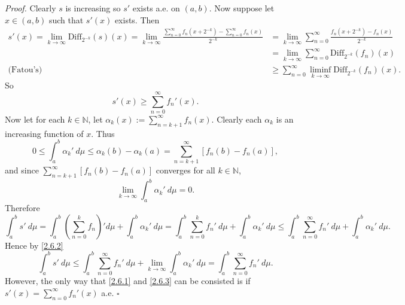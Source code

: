 \documentclass[12pt]{article}
\newcounter{ProofCounter}
\newenvironment{Proof}{\stepcounter{ProofCounter}\textit{Proof.}}{\hfill$\square$}
\begin{document}
\begin{Proof}
Clearly $s$ is increasing so $s'$ exists a.e. on $(a,b)$. Now suppose let $x \in (a,b)$ such that $s'(x)$ exists. Then
\begin{align*}
s'(x) = \lim_{k\rightarrow\infty}\text{Diff}_{2^{-k}}(s)(x) = \lim_{k\rightarrow\infty}\frac{\sum_{n=0}^{\infty}f_{n}(x + 2^{-k}) - \sum_{n=0}^{\infty}
f_{n}(x)}{2^{-k}} 
& = \lim_{k\rightarrow\infty}\sum_{n=0}^{\infty}\frac{f_{n}(x + 2^{-k}) - f_{n}(x)}{2^{-k}} \\
& = \lim_{k\rightarrow\infty}\sum_{n=0}^{\infty}\text{Diff}_{2^{-k}}(f_{n})(x) \\
\text{(Fatou's) } & \geq \sum_{n=0}^{\infty} \liminf_{k\rightarrow \infty}\text{Diff}_{2^{-k}}(f_{n})(x).
\end{align*}
So 
\begin{equation}
s'(x) \geq \sum_{n=0}^{\infty}f_{n}'(x).
\label{2.6.1}
\end{equation}
Now let for each $k \in \mathbb{N}$, let $\alpha_{k}(x) := \sum_{n=k+1}^{\infty}f_{n}(x)$. Clearly each $\alpha_{k}$ is an increasing function of $x$.
Thus
\[0 \leq \int_{a}^{b} \alpha_{k}'\ d\mu \leq \alpha_{k}(b) - \alpha_{k}(a) = \sum_{n=k+1}^{\infty}[f_{n}(b) - f_{n}(a)], \]
and since $\sum_{n=k+1}^{\infty}[f_{n}(b) - f_{n}(a)]$ converges for all $k \in \mathbb{N}$, 
\begin{equation}
\lim_{k\rightarrow\infty} \int_{a}^{b}\alpha_{k}'\ d\mu = 0.
\label{2.6.2}
\end{equation}
Therefore 
\[ \int_{a}^{b}s'\ d\mu = \int_{a}^{b}\left( \sum_{n=0}^{k}f_{n} \right)' d\mu + \int_{a}^{b}\alpha_{k}'\ d\mu 
= \int_{a}^{b}\sum_{n=0}^{k}f_{n}'\ d\mu + \int_{a}^{b}\alpha_{k}'\ d\mu 
\leq \int_{a}^{b} \sum_{n=0}^{\infty}f_{n}'\ d\mu + \int_{a}^{b}\alpha_{k}'\ d\mu. \]
Hence by \eqref{2.6.2}
\begin{equation}
\int_{a}^{b}s'\ d\mu \leq \int_{a}^{b}\sum_{n=0}^{\infty}f_{n}'\ d\mu + \lim_{k\rightarrow\infty}\int_{a}^{b}\alpha_{k}'\ d\mu =
\int_{a}^{b}\sum_{n=0}^{\infty}f_{n}'\ d\mu.
\label{2.6.3}
\end{equation}
However, the only way that \eqref{2.6.1} and \eqref{2.6.3} can be consisted is if $s'(x) = \sum_{n=0}^{\infty}f_{n}'(x)$ a.e.
\end{Proof}
\end{document}
